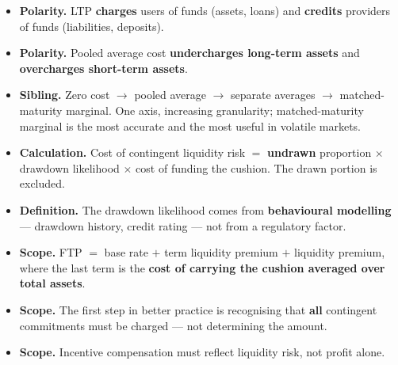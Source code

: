 \begin{lrtrapbox}
\begin{itemize}
\item \textbf{Polarity.} LTP \textbf{charges} users of funds (assets, loans) and \textbf{credits} providers of funds (liabilities, deposits).
\item \textbf{Polarity.} Pooled average cost \textbf{undercharges long-term assets} and \textbf{overcharges short-term assets}.
\item \textbf{Sibling.} Zero cost $\rightarrow$ pooled average $\rightarrow$ separate averages $\rightarrow$ matched-maturity marginal. One axis, increasing granularity; matched-maturity marginal is the most accurate and the most useful in volatile markets.
\item \textbf{Calculation.} Cost of contingent liquidity risk $=$ \textbf{undrawn} proportion $\times$ drawdown likelihood $\times$ cost of funding the cushion. The drawn portion is excluded.
\item \textbf{Definition.} The drawdown likelihood comes from \textbf{behavioural modelling} --- drawdown history, credit rating --- not from a regulatory factor.
\item \textbf{Scope.} FTP $=$ base rate $+$ term liquidity premium $+$ liquidity premium, where the last term is the \textbf{cost of carrying the cushion averaged over total assets}.
\item \textbf{Scope.} The first step in better practice is recognising that \textbf{all} contingent commitments must be charged --- not determining the amount.
\item \textbf{Scope.} Incentive compensation must reflect liquidity risk, not profit alone.
\end{itemize}
\end{lrtrapbox}
